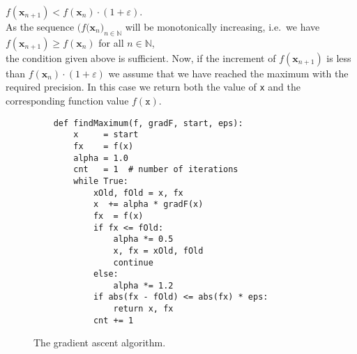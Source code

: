 \begin{enumerate}
      $f(\mathbf{x}_{n+1}) < f(\mathbf{x}_{n}) \cdot (1 + \varepsilon)$.
      \\[0.2cm]
      As the sequence $\bigl(f(\mathbf{x}_n\bigr)_{n\in\mathbb{N}}$ will be monotonically
      increasing, i.e.~we have
      \\[0.2cm]
      \hspace*{1.3cm}
      $f(\mathbf{x}_{n+1}) \geq f(\mathbf{x}_{n})$ \quad for all $n\in\mathbb{N}$,
      \\[0.2cm]
      the condition given above is sufficient.  Now, if the increment of  $f(\mathbf{x}_{n+1})$ is less than $f(\mathbf{x}_{n}) \cdot (1 + \varepsilon)$ 
      we assume that we have reached the maximum with the required precision.  In this case we return both the
      value of \texttt{x} and the corresponding function value $f(\mathtt{x})$.
\end{enumerate}

\begin{figure}[!ht]
\centering
\begin{verbatim}
    def findMaximum(f, gradF, start, eps):
        x     = start
        fx    = f(x)
        alpha = 1.0
        cnt   = 1  # number of iterations
        while True:
            xOld, fOld = x, fx
            x  += alpha * gradF(x)
            fx  = f(x)
            if fx <= fOld:   
                alpha *= 0.5
                x, fx = xOld, fOld
                continue
            else:
                alpha *= 1.2
            if abs(fx - fOld) <= abs(fx) * eps:
                return x, fx
            cnt += 1                  
\end{verbatim}

\caption{The gradient ascent algorithm.}
\label{fig:gradient-ascent.py}
\end{figure}

